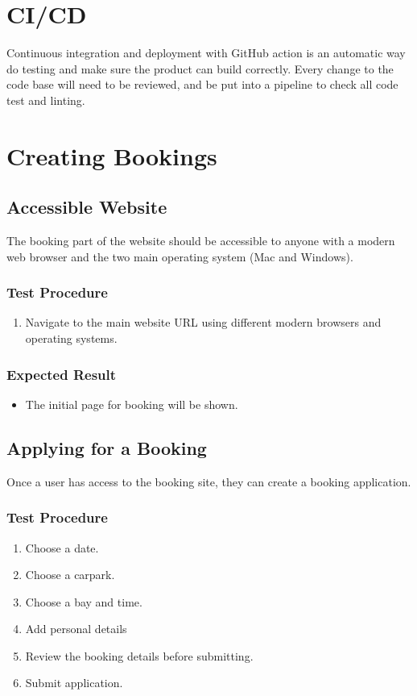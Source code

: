 \documentclass[a4paper, draft]{article}
\begin{document}
\section{CI/CD}
Continuous integration and deployment with GitHub action is an automatic way do testing and make sure the product can build correctly. Every change to the code base will need to be reviewed, and be put into a pipeline to check all code test and linting. 

\newpage
\section{Creating Bookings}
\subsection{Accessible Website}
The booking part of the website should be accessible to anyone with a modern web browser and the two main operating system (Mac and Windows).

\subsubsection{Test Procedure}
\begin{enumerate}
  \item Navigate to the main website URL using different modern browsers and operating systems.
\end{enumerate}

\subsubsection{Expected Result}
\begin{itemize}
  \item The initial page for booking will be shown.
\end{itemize}

\subsection{Applying for a Booking}
Once a user has access to the booking site, they can create a booking application.

\subsubsection{Test Procedure}
\begin{enumerate}
  \item Choose a date.
  \item Choose a carpark.
  \item Choose a bay and time.
  \item Add personal details
  \item Review the booking details before submitting.
  \item Submit application.
\end{enumerate}
\end{document}
